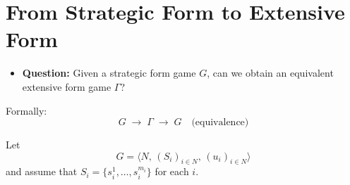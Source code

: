 \documentclass[12pt, a4paper]{article}
\begin{document}
\section{From Strategic Form to Extensive Form}

\begin{itemize}
  \item \textbf{Question:} Given a strategic form game $G$, can we obtain an equivalent extensive form game $\Gamma$?
\end{itemize}

Formally:
\[
  G \;\longrightarrow\; \Gamma \;\longrightarrow\; G \quad \text{(equivalence)}
\]

Let
\[
  G = \bigl\langle N,\, (S_i)_{i \in N},\, (u_i)_{i \in N} \bigr\rangle
\]
and assume that $S_i = \{s_i^1, \ldots, s_i^{m_i}\}$ for each $i$.
\end{document}
